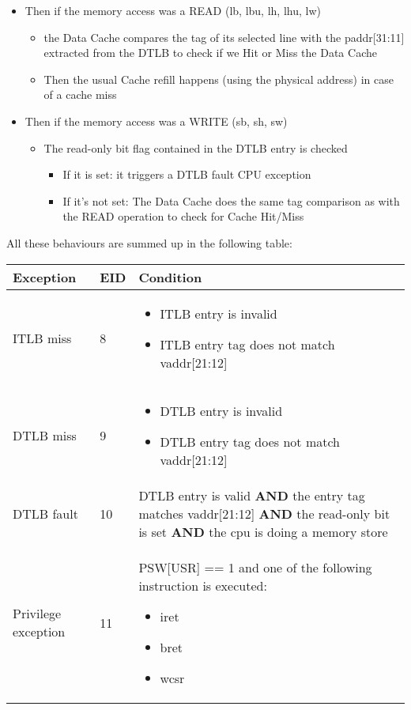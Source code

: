\documentclass[a4paper,11pt]{article}
\begin{document}
\begin{itemize}
	\item Then if the memory access was a READ (lb, lbu, lh, lhu, lw)
	\begin{itemize}
		\item the Data Cache compares the tag of its selected line with the paddr[31:11] extracted from the DTLB to check if we Hit or Miss the Data Cache
		\item Then the usual Cache refill happens (using the physical address) in case of a cache miss
	\end{itemize}
	\item Then if the memory access was a WRITE (sb, sh, sw)
	\begin{itemize}
		\item The read-only bit flag contained in the DTLB entry is checked
		\begin{itemize}
			\item If it is set: it triggers a DTLB fault CPU exception
			\item If it's not set: The Data Cache does the same tag comparison as with the READ operation to check for Cache Hit/Miss
		\end{itemize}
	\end{itemize}
\end{itemize}

All these behaviours are summed up in the following table:
\newline

\begin{tabular}{|l l p{}|}
\hline
\bf{Exception} & \bf{EID} & \bf{Condition} \\
\hline
ITLB miss & 8 &
\parbox{0.5\textwidth}{
\begin{itemize}
	\item ITLB entry is invalid
	\item ITLB entry tag does not match vaddr[21:12]
\end{itemize} }
\\
\hline
DTLB miss & 9 &
\parbox{0.5\textwidth}{
\begin{itemize}
	\item DTLB entry is invalid
	\item DTLB entry tag does not match vaddr[21:12]
\end{itemize} }
\\
\hline
DTLB fault & 10 &
DTLB entry is valid \newline\textbf{AND} the entry tag matches vaddr[21:12] \newline\textbf{AND} the read-only bit is set \newline\textbf{AND} the cpu is doing a memory store
\\
\hline
Privilege exception & 11 &
\parbox{0.5\textwidth}{
PSW[USR] == 1 and one of the following instruction is executed:\newline
\begin{itemize}
	\item iret
	\item bret
	\item wcsr
\end{itemize}
}
\\
\hline
\end{tabular}
\end{document}
